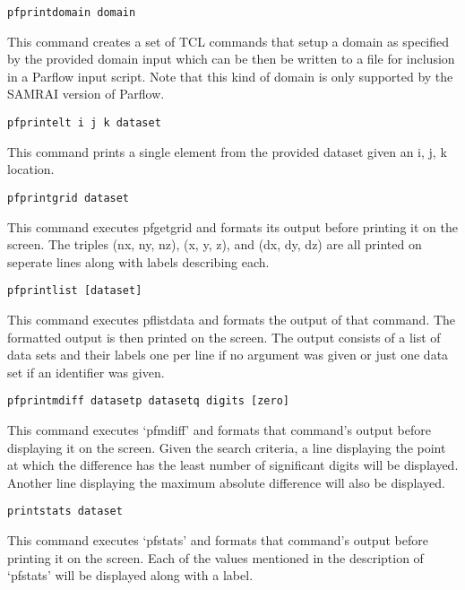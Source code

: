 \begin{description}
  
\item{\begin{verbatim}pfprintdomain domain\end{verbatim}} This command
 creates a set of TCL commands that setup a domain as specified by the
 provided domain input which can be then be written to a file for
 inclusion in a Parflow input script.  Note that this kind of domain
 is only supported by the SAMRAI version of Parflow.

\item{\begin{verbatim}pfprintelt i j k dataset\end{verbatim}}
This command prints a single element from the provided dataset given an i, j, k location.  
        
\item{\begin{verbatim}pfprintgrid dataset\end{verbatim}}
This command executes pfgetgrid and formats its output before printing
it on the screen.  The triples (nx, ny, nz), (x, y, z), and
(dx, dy, dz) are all printed on seperate lines along with labels
describing each.
        
        
\item{\begin{verbatim}pfprintlist [dataset]\end{verbatim}}
This command executes pflistdata and formats the output of that
command.  The formatted output is then printed on the screen.  The
output consists of a list of data sets and their labels one per line
if no argument was given or just one data set if an identifier was
given.
        
        
\item{\begin{verbatim}pfprintmdiff datasetp datasetq digits [zero]\end{verbatim}}
This command executes `pfmdiff' and formats that command's output
before displaying it on the screen.  Given the search criteria, a line
displaying the point at which the difference has the least number of
significant digits will be displayed.  Another line displaying the
maximum absolute difference will also be displayed.
 
        
\item{\begin{verbatim}printstats dataset\end{verbatim}}
This command executes `pfstats' and formats that command's output
before printing it on the screen.  Each of the values mentioned in the
description of `pfstats' will be displayed along with a label.



\end{description}

